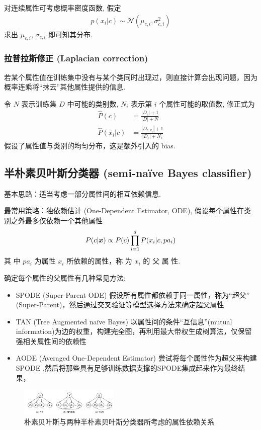 对连续属性可考虑概率密度函数, 假定
\begin{align*}
    p(x_i|c)\sim \mathcal{N}(\mu_{c,i}, \sigma_{c,i}^2)
\end{align*}
求出 $\mu_{c,i}$, $\sigma_{c,i}$ 即可知其分布. 
\subsubsection{拉普拉斯修正 (Laplacian correction)}
若某个属性值在训练集中没有与某个类同时出现过，则直接计算会出现问题，因为概率连乘将“抹去”其他属性提供的信息. 

令 $N$ 表示训练集 $D$ 中可能的类别数, $N_i$ 表示第 $i$ 个属性可能的取值数, 修正式为
\begin{align*}
    \hat{P}(c)&=\frac{|D_c|+1}{|D|+N}\\
    \hat{P}(x_i|c)&=\frac{|D_{c,x_i}|+1}{|D_c|+N_i}
\end{align*}
假设了属性值与类别的均匀分布，这是额外引入的 bias. 

\subsection{半朴素贝叶斯分类器 (semi-naïve Bayes classifier)}
基本思路：适当考虑一部分属性间的相互依赖信息. 

最常用策略：独依赖估计 (One-Dependent Estimator, ODE), 假设每个属性在类别之外最多仅依赖一个其他属性
\begin{align*}
    P(c|\bm{x})\propto P(c)\prod_{i=1}^d P(x_i|c, pa_i)
\end{align*}
其 中 $p a_i$ 为属性 $x_i$ 所依赖的属性，称 为 $x_i$ 的 父 属 性. 

确定每个属性的父属性有几种常见方法:
\begin{itemize}
    \item SPODE (Super-Parent ODE)
    \subitem 假设所有属性都依赖于同一属性，称为``超父'' (Super-Parent)，然后通过交叉验证等模型选择方法来确定超父属性
    \item TAN (Tree Augmented naïve Bayes)
    \subitem 以属性间的条件``互信息''(mutual information)为边的权重，构建完全图，再利用最大带权生成树算法，仅保留强相关属性间的依赖性
    \item AODE  (Averaged One-Dependent Estimator)
    \subitem 尝试将每个属性作为超父来构建SPODE ,然后将那些具有足够训练数据支撑的SPODE集成起来作为最终结果，
\end{itemize}

\begin{figure}[!htb]
    \centering
    \includegraphics[width=0.42\textwidth]{pic/ML6/朴素贝叶斯与两种半朴素贝叶斯分类器所考虑的属性依赖关系}
    \caption{朴素贝叶斯与两种半朴素贝叶斯分类器所考虑的属性依赖关系}
\end{figure}

